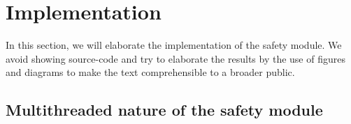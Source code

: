 \documentclass[12pt]{scrreprt}
\begin{document}
\newpage
\section{Implementation}
\label{Implementation}
In this section, we will elaborate the implementation of the safety module. We avoid showing source-code and try to elaborate the results by the use of figures and diagrams to make the text comprehensible to a broader public.

\subsection{Multithreaded nature of the safety module}
\label{Multithreaded nature of the safety module}
\end{document}
